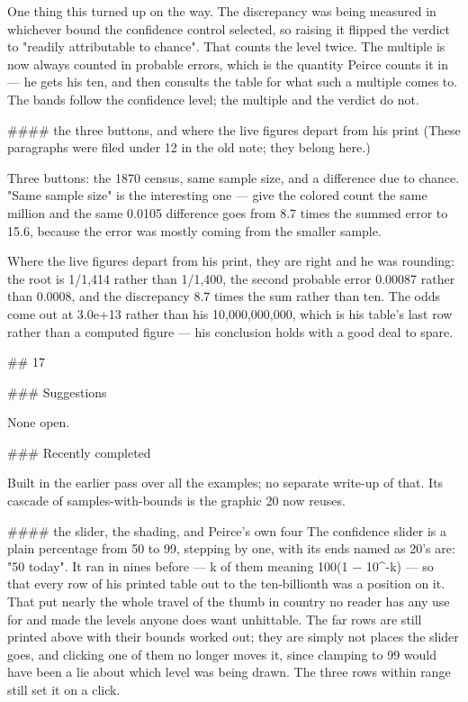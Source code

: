 One thing this turned up on the way. The discrepancy was being measured in
whichever bound the confidence control selected, so raising it flipped the
verdict to "readily attributable to chance". That counts the level twice. The
multiple is now always counted in probable errors, which is the quantity Peirce
counts it in — he gets his ten, and then consults the table for what such a
multiple comes to. The bands follow the confidence level; the multiple and the
verdict do not.

#### the three buttons, and where the live figures depart from his print
(These paragraphs were filed under 12 in the old note; they belong here.)

Three buttons: the 1870 census, same sample size, and a difference due to
chance. "Same sample size" is the interesting one — give the colored count the
same million and the same 0.0105 difference goes from 8.7 times the summed error
to 15.6, because the error was mostly coming from the smaller sample.

Where the live figures depart from his print, they are right and he was
rounding: the root is 1/1,414 rather than 1/1,400, the second probable error
0.00087 rather than 0.0008, and the discrepancy 8.7 times the sum rather than
ten. The odds come out at 3.0e+13 rather than his 10,000,000,000, which is his
table's last row rather than a computed figure — his conclusion holds with a
good deal to spare.


## 17

### Suggestions

None open.

### Recently completed

Built in the earlier pass over all the examples; no separate write-up of that.
Its cascade of samples-with-bounds is the graphic 20 now reuses.

#### the slider, the shading, and Peirce's own four
The confidence slider is a plain percentage from 50 to 99, stepping by one, with
its ends named as 20's are: "50%
today". It ran in nines before — k of them meaning 100(1 − 10^-k) — so that
every row of his printed table out to the ten-billionth was a position on it.
That put nearly the whole travel of the thumb in country no reader has any use
for and made the levels anyone does want unhittable. The far rows are still
printed above with their bounds worked out; they are simply not places the
slider goes, and clicking one of them no longer moves it, since clamping to 99
would have been a lie about which level was being drawn. The three rows within
range still set it on a click.

